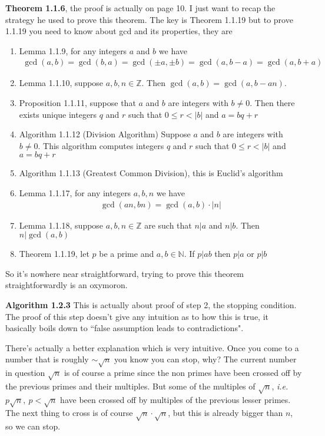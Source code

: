 \documentclass[aps,preprint,preprintnumbers,nofootinbib,showpacs,prd]{revtex4-1}
\newcommand{\ie}{{\it i.e.} }
\newcommand{\nbea}{\begin{eqnarray*}}
\newcommand{\neea}{\end{eqnarray*}}
\begin{document}
{\bf Theorem 1.1.6}, the proof is actually on page 10. I just want to recap the strategy he used to prove this theorem. The key is Theorem 1.1.19 but to prove 1.1.19 you need to know about gcd and its properties, they are
\begin{enumerate}
\item Lemma 1.1.9, for any integers $a$ and $b$ we have
%
\nbea
\gcd(a,b) = \gcd(b,a) = \gcd(\pm a,\pm b) = \gcd(a,b-a) = \gcd(a,b+a)
\neea
%
\item Lemma 1.1.10, suppose $a,b,n \in \mathbb{Z}$. Then $\gcd(a,b) = \gcd(a,b-an)$.
\item Proposition 1.1.11, suppose that $a$ and $b$ are integers with $b \neq 0$. Then there exists unique integers $q$ and $r$ such that $0 \le r < |b|$ and $a = bq + r$
\item Algorithm 1.1.12 (Division Algorithm) Suppose $a$ and $b$ are integers with $b \neq 0$. This algorithm computes integers $q$ and $r$ such that $0 \le r < |b|$ and $a = bq + r$
\item Algorithm 1.1.13 (Greatest Common Division), this is Euclid's algorithm
\item Lemma 1.1.17, for any integers $a,b,n$ we have
%
\nbea
\gcd(an,bn) = \gcd(a,b) \cdot |n|
\neea
%
\item Lemma 1.1.18, suppose $a,b,n \in \mathbb{Z}$ are such that $n|a$ and $n|b$. Then $n|\gcd(a,b)$
\item Theorem 1.1.19, let $p$ be a prime and $a,b \in \mathbb{N}$. If $p|ab$ then $p|a$ or $p|b$
\end{enumerate}
So it's nowhere near straightforward, trying to prove this theorem straightforwardly is an oxymoron.

{\bf Algorithm 1.2.3} This is actually about proof of step 2, the stopping condition. The proof of this step doesn't give any intuition as to how this is true, it basically boils down to ``false assumption leads to contradictions".

There's actually a better explanation which is very intuitive. Once you come to a number that is roughly $\sim \sqrt{n}$ you know you can stop, why? The current number in question $\sqrt{n}$ is of course a prime since the non primes have been crossed off by the previous primes and their multiples. But some of the multiples of $\sqrt{n}$, \ie $p \sqrt{n}, ~ p < \sqrt{n}$ have been crossed off by multiples of the previous lesser primes. The next thing to cross is of course $\sqrt{n} \cdot \sqrt{n}$, but this is already bigger than $n$, so we can stop.
\end{document}

